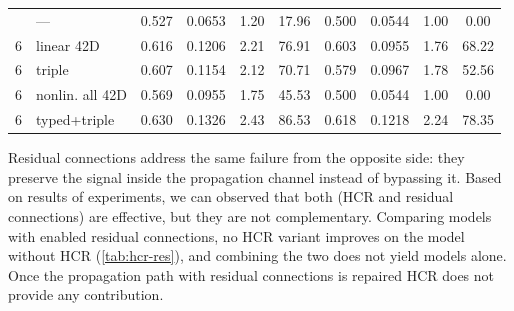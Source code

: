\begin{table}[htbp]
\begin{tabular}{clcccccccc}
    \addlinespace[4pt]
    6 & ---              & 0.527 & 0.0653 & 1.20 & 17.96 & 0.500 & 0.0544 & 1.00 &  0.00 \\
    6 & linear 42D       & 0.616 & 0.1206 & 2.21 & 76.91 & 0.603 & 0.0955 & 1.76 & 68.22 \\
    6 & triple           & 0.607 & 0.1154 & 2.12 & 70.71 & 0.579 & 0.0967 & 1.78 & 52.56 \\
    6 & nonlin. all 42D  & 0.569 & 0.0955 & 1.75 & 45.53 & 0.500 & 0.0544 & 1.00 &  0.00 \\
    6 & typed+triple     & 0.630 & 0.1326 & 2.43 & 86.53 & 0.618 & 0.1218 & 2.24 & 78.35 \\
    \bottomrule
  \end{tabular}
\end{table}

    Residual connections address the same failure from the opposite side: they
    preserve the signal inside the propagation channel instead of bypassing it.
    Based on results of experiments, we can observed that both (HCR and residual connections) are effective, but they are not complementary.
    Comparing models with enabled residual connections, no HCR variant improves on the model without HCR
    (\cref{tab:hcr-res}), and combining the two does not yield models alone.
    Once the propagation path with residual connections is repaired HCR does not provide any contribution. 

